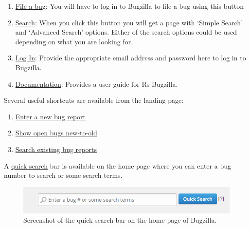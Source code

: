 \documentclass[
]{book}
\begin{document}
\begin{enumerate}
\def\labelenumi{\arabic{enumi}.}
\item
  \href{https://bugs.r-project.org/enter_bug.cgi}{File a bug}: You will have to log in to Bugzilla to file a bug using this button
\item
  \href{https://bugs.r-project.org/query.cgi}{Search}: When you click this button you will get a page with `Simple Search' and `Advanced Search' options. Either of the search options could be used depending on what you are looking for.
\item
  \href{https://bugs.r-project.org/?GoAheadAndLogIn=1}{Log In}: Provide the appropriate email address and password here to log in to Bugzilla.
\item
  \href{https://bugzilla.readthedocs.io/en/latest/using/index.html}{Documentation}: Provides a user guide for R\textquotesingle s Bugzilla.
\end{enumerate}

Several useful shortcuts are available from the landing page:

\begin{enumerate}
\def\labelenumi{\arabic{enumi}.}
\item
  \href{https://bugs.r-project.org/enter_bug.cgi}{Enter a new bug report}
\item
  \href{https://bugs.r-project.org/buglist.cgi?bug_file_loc_type=allwordssubstr&bug_status=NEW&bug_status=ASSIGNED&bug_status=CONFIRMED&bug_status=REOPENED&bug_status=UNCONFIRMED&bugidtype=include&chfieldto=Now&cmdtype=doit&emailassigned_to1=1&emailassigned_to2=1&emailcc2=1&emailreporter2=1&emailtype1=substring&emailtype2=substring&field0-0-0=noop&long_desc_type=substring&order=bugs.delta_ts\%20desc&query_format=advanced&short_desc_type=allwordssubstr&type0-0-0=noop}{Show open bugs new-to-old}
\item
  \href{https://bugs.r-project.org/query.cgi}{Search existing bug reports}
\end{enumerate}

A \href{https://bugs.r-project.org/page.cgi?id=quicksearch.html}{quick search} bar is available on the home page where you can enter a bug number to search or some search terms.

\begin{figure}
\centering
\includegraphics{img/quicksearch.png}
\caption{Screenshot of the quick search bar on the home page of Bugzilla.}
\end{figure}
\end{document}
